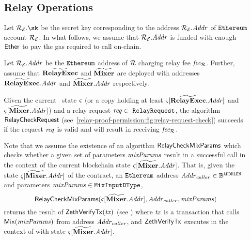 \subsection{Relay Operations}

Let $\relayEthAccount.\sk$ be the secret key corresponding to the address $\mathcal{{R}_{E}}.\mathit{Addr}$ of $\texttt{Ethereum}$ account $\mathcal{{R}_{E}}$.
In what follows, we assume that $\mathcal{{R}_{E}}.\mathit{Addr}$ is funded with enough $\mathsf{Ether}$ to pay the gas required to call \relayexec{} on-chain.


Let $\mathcal{{R}_{E}}{}.\mathit{Addr}$ be the $\texttt{Ethereum}$ address of $\mathcal{R}$ charging relay fee $\mathit{fee_{\mathcal{R}}}$. Further, assume that $\widetilde{\mathbf{RelayExec}}$ and $\widetilde{\mathbf{Mixer}}$ are deployed with addresses $\widetilde{\mathbf{RelayExec}}{}.\mathit{Addr}$ and $\widetilde{\mathbf{Mixer}}.\mathit{Addr}$ respectively.

Given the current \ethereum~state $\mathit{\varsigma}$ (or a copy holding at least $\mathit{\varsigma}[\widetilde{\mathbf{RelayExec}}{}.\mathit{Addr}]$ and $\mathit{\varsigma}[\widetilde{\mathbf{Mixer}}.\mathit{Addr}]$) and a relay request $\mathit{req} \in\ {\mathtt{RelayRequest}}$, the algorithm $\mathsf{RelayCheckRequest}$ (see~\cref{relay-proof-permission:fig:relay-request-check}) succeeds if the request $\mathit{req}$ is valid and will result in \relayEthAccount{} receiving $\mathit{fee_{\mathcal{R}}}$.


Note that we assume the existence of an algorithm $\mathsf{RelayCheckMixParams}$ which checks whether a given set of \mix{} parameters $\mathit{mixParams}$ result in a successful \mix{} call in the context of the current blockchain state $\mathit{\varsigma}[\widetilde{\mathbf{Mixer}}{}.\mathit{Addr}]$. That is, given the state $\mathit{\varsigma}[\widetilde{\mathbf{Mixer}}{}.\mathit{Addr}]$ of the \mixer{} contract, an $\texttt{Ethereum}$ address $\mathit{Addr}_{caller} \in \mathbb{B}^{\mathtt{ADDRLEN}}$ and \mix{} parameters $\mathit{mixParams} \in {\mathtt{MixInputDType}}$,
\[
  \mathsf{RelayCheckMixParams}(\mathit{\varsigma}[\widetilde{\mathbf{Mixer}}{}.\mathit{Addr}], \mathit{Addr}_{caller}, \mathit{mixParams})
\]
returns the result of $\mathsf{ZethVerifyTx}(\mathit{tx})$ (see \cite[Section 2.5]{zeth-protocol}) where $\mathit{tx}$ is a transaction that calls $\mathsf{Mix}(\mathit{mixParams})$ from address $\mathit{Addr}_{caller}$, and $\mathsf{ZethVerifyTx}$ executes in the context of \mixer{} with state $\mathit{\varsigma}[\widetilde{\mathbf{Mixer}}{}.\mathit{Addr}]$.

\newcommand{\mixeraddr}{\ensuremath{\varstyle{mixerAddr}}\xspace}
\newcommand{\relayproxyaddr}{\ensuremath{\varstyle{relayProxyAddr}}\xspace}

